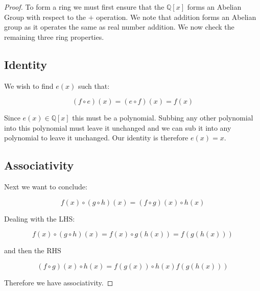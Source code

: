 
\begin{proof}
  To form a ring we must first ensure that the $\mathbb{Q}[x]$ forms an Abelian Group with respect to the $+$ operation. We note that addition forms an Abelian group as it operates the same as real number addition. We now check the remaining three ring properties.

  \subsection{Identity}

  We wish to find $e(x)$ such that:

  \[(f \circ e)(x) = (e \circ f)(x) = f(x)\]

  Since $e(x) \in \mathbb{Q}[x]$ this must be a polynomial. Subbing any other polynomial into this polynomial must leave it unchanged and we can sub it into any polynomial to leave it unchanged. Our identity is therefore $e(x)=x$.

  \subsection{Associativity}

  Next we want to conclude:

  \[f(x)\circ (g \circ h)(x) = (f \circ g)(x)\circ h(x)\]

Dealing with the LHS:

\[f(x)\circ (g \circ h)(x) = f(x) \circ g(h(x)) = f(g(h(x)))\]

and then the RHS

\[(f \circ g)(x)\circ h(x) = f(g(x)) \circ h(x) f(g(h(x)))\]

Therefore we have associativity.


\end{proof}
